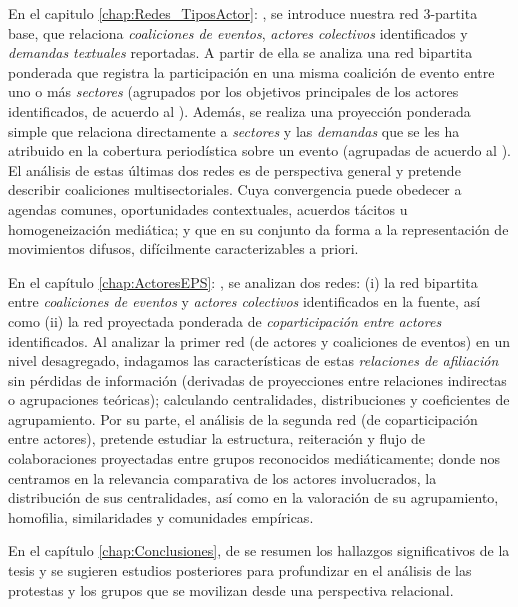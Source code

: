 \documentclass[letterpaper, 11pt]{book}
\theoremstyle{definition}
\theoremstyle{remark}
\begin{document}
En el capitulo \ref{chap:Redes_TiposActor}: , se introduce nuestra red 3-partita base, que relaciona \emph{coaliciones de eventos}, \emph{actores colectivos} identificados y \emph{demandas textuales} reportadas. 
A partir de ella se analiza una red bipartita ponderada que registra la participación en una misma coalición de evento entre uno o más \emph{sectores} (agrupados por los objetivos principales de los actores identificados, de acuerdo al ). 
Además, se realiza una proyección ponderada simple que relaciona directamente a \emph{sectores} y las \emph{demandas} que se les ha atribuido en la cobertura periodística sobre un evento (agrupadas de acuerdo al ). 
El análisis de estas últimas dos redes es de perspectiva general y pretende describir coaliciones multisectoriales. 
Cuya convergencia puede obedecer a agendas comunes, oportunidades contextuales, acuerdos tácitos u homogeneización mediática; y que en su conjunto da forma a la representación de movimientos difusos, difícilmente caracterizables a priori. 


En el capítulo \ref{chap:ActoresEPS}: , se analizan dos redes: 
(i) la red bipartita entre \emph{coaliciones de eventos} y \emph{actores colectivos} identificados en la fuente, así como 
(ii) la red proyectada ponderada de \emph{coparticipación entre actores} identificados. 
Al analizar la primer red (de actores y coaliciones de eventos) en un nivel desagregado, indagamos las características de estas \emph{relaciones de afiliación} sin pérdidas de información (derivadas de proyecciones entre relaciones indirectas o agrupaciones teóricas); calculando centralidades, distribuciones y coeficientes de agrupamiento. 
Por su parte, el análisis de la segunda red (de coparticipación entre actores), pretende estudiar la estructura, reiteración y flujo de colaboraciones proyectadas entre grupos reconocidos mediáticamente; donde nos centramos en la relevancia comparativa de los actores involucrados, la distribución de sus centralidades, así como en la valoración de su agrupamiento, homofilia, similaridades y comunidades empíricas. 


En el capítulo \ref{chap:Conclusiones}, de  se resumen los hallazgos significativos de la tesis y se sugieren estudios posteriores para profundizar en el análisis de las protestas y los grupos que se movilizan desde una perspectiva relacional.
\end{document}
